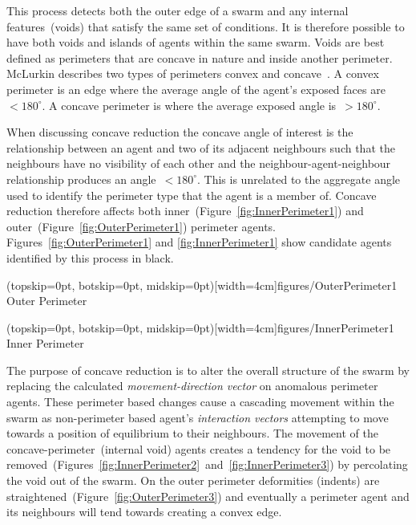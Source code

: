 \documentclass{ieeeaccess}
\begin{document}
This process detects both the outer edge of a swarm and any internal features~(voids) that satisfy the same set of conditions. It is therefore possible to have both voids and islands of agents within the same swarm. Voids are best defined as perimeters that are concave in nature and inside another perimeter. McLurkin describes two types of perimeters convex and concave~\cite{MD:09}. A convex perimeter is an edge where the average angle of the agent's exposed faces are~$< 180^\circ$. A concave perimeter is where the average exposed angle is~$> 180^\circ$.
 
When discussing concave reduction the concave angle of interest is the relationship between an agent and two of its adjacent neighbours such that the neighbours have no visibility of each other and the neighbour-agent-neighbour relationship produces an angle~$< 180^\circ$. This is unrelated to the aggregate angle used to identify the perimeter type that the agent is a member of. Concave reduction therefore affects both inner~(Figure~\ref{fig:InnerPerimeter1}) and outer~(Figure~\ref{fig:OuterPerimeter1}) perimeter agents. Figures~\ref{fig:OuterPerimeter1} and \ref{fig:InnerPerimeter1} show candidate agents identified by this process in black. 

\Figure[t!](topskip=0pt, botskip=0pt, midskip=0pt)[width=4cm]{figures/OuterPerimeter1}
{Outer Perimeter\label{fig:OuterPerimeter1}}


\Figure[t!](topskip=0pt, botskip=0pt, midskip=0pt)[width=4cm]{figures/InnerPerimeter1}
{Inner Perimeter\label{fig:InnerPerimeter1}}


The purpose of concave reduction is to alter the overall structure of the swarm by replacing the calculated \textit{movement-direction vector} on anomalous perimeter agents. These perimeter based changes cause a cascading movement within the swarm as non-perimeter based agent's \textit{interaction vectors} attempting to move towards a position of equilibrium to their neighbours. The movement of the concave-perimeter~(internal void) agents creates a tendency for the void to be removed~(Figures~\ref{fig:InnerPerimeter2}~and~\ref{fig:InnerPerimeter3}) by percolating the void out of the swarm. On the outer perimeter deformities (indents) are straightened~(Figure~\ref{fig:OuterPerimeter3}) and eventually a perimeter agent and its neighbours will tend towards creating a convex edge.
\end{document}
